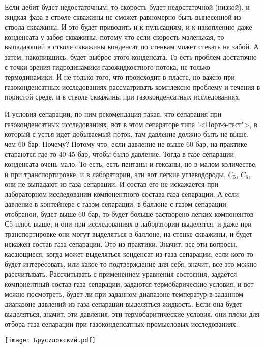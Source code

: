 \documentclass[main.tex]{subfiles}
\begin{document}
Если дебит будет недостаточным, то скорость будет недостаточной (низкой), и жидкая фаза в стволе скважины не сможет равномерно быть вынесенной из ствола скважины.
И это будет приводить и к пульсациям, и к накоплению даже конденсата у забоя скважины, потому что если скорость маленькая, то выпадающий в стволе скважины конденсат по стенкам может стекать на забой.
А затем, накопившись, будет выброс этого конденсата.
То есть проблем достаточно с точки зрения гидродинамики газожидкостного потока, не только термодинамики.
И не только того, что происходит в пласте, но важно при газоконденсатных исследованиях рассматривать комплексно проблему и течения в пористой среде, и в стволе скважины при газоконденсатных исследованиях.

И условия сепарации, по ним рекомендация такая, что сепарация при газоконденсатных исследованиях, вот в этом сепараторе типа "<Порт-э-тест">, в который с устья идет добываемый поток, там давление должно быть не выше, чем 60 бар.
Почему?
Потому что, если давление не выше 60 бар, на практике стараются где-то 40-45 бар, чтобы было давление.
Тогда в газе сепарации конденсата очень мало.
То есть, есть пентаны и гексаны, но в малом количестве, и при транспортировке, и в лаборатории, эти вот лёгкие углеводороды, $C_5$, $C_6$, они не выпадают из газа сепарации.
И состав его не искажается при лабораторном исследовании компонентного состава газа сепарации.
А если давление в контейнере с газом сепарации, в баллоне с газом сепарации отобранои, будет выше 60 бар, то будет больше растворено лёгких компонентов С5 плюс выше, и они при исследованиях в лаборатории выделятся, и даже при транспортировке они могут выделяться в баллоне, на стенке скважины, и будет искажён состав газа сепарации.
Это из практики.
Значит, все эти вопросы, касающиеся, когда может выделяться конденсат из газа сепарации, если кого-то будет интересовать, или какое-то подтверждение для себя, значит, все это можно рассчитывать.
Рассчитывать с применением уравнения состояния, задаётся компонентный состав газа сепарации, задаются термобарические условия, и вот можно посмотреть, будет ли при заданном диапазоне температур в заданном диапазоне давлений из газа сепарации выделяться жидкость.
Если она будет выделяться, значит, эти давления, эти термобаритические условия, они плохи для отбора газа сепарации при газоконденсатных промысловых исследованиях.

\begin{center}
\texttt{[image: Брусиловский.pdf]}
\end{center}
\end{document}
